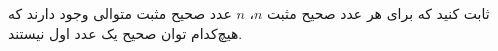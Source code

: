 ثابت کنید که برای هر عدد صحیح مثبت $n$، $n$ عدد صحیح مثبت متوالی وجود دارند که هیچ‌کدام توان صحیح یک عدد اول نیستند.
